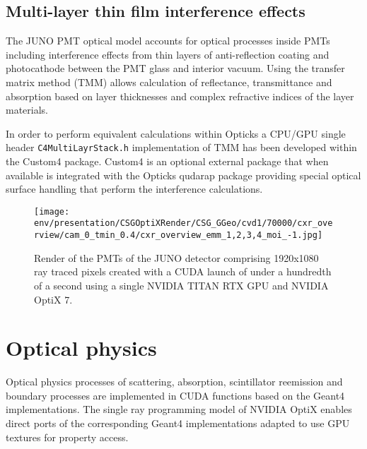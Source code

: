 \documentclass{webofc}
\begin{document}
%
%
\subsection{Multi-layer thin film interference effects} 
%
The JUNO PMT optical model\cite{jpom} accounts for optical processes inside PMTs including 
interference effects from thin layers of anti-reflection coating and photocathode between 
the PMT glass and interior vacuum. Using the transfer matrix method (TMM) allows 
calculation of reflectance, transmittance and absorption based on layer thicknesses 
and complex refractive indices of the layer materials. 

In order to perform equivalent calculations within Opticks a CPU/GPU 
single header {\tt C4MultiLayrStack.h} implementation of TMM 
has been developed within the Custom4 package\cite{custom4}. 
Custom4 is an optional external package that when available 
is integrated with the Opticks qudarap package providing special 
optical surface handling that perform the interference calculations.   
%
%
%
\begin{figure}
\centering
\texttt{[image: env/presentation/CSGOptiXRender/CSG\_GGeo/cvd1/70000/cxr\_overview/cam\_0\_tmin\_0.4/cxr\_overview\_emm\_1,2,3,4\_moi\_-1.jpg]}
\caption{Render of the PMTs of the JUNO detector comprising 1920x1080 ray traced pixels created with a CUDA launch of under a hundredth of a second  
using a single NVIDIA TITAN RTX GPU and NVIDIA OptiX 7.
\label{j1808}}
\end{figure}
%
%
\section{Optical physics}%
%
Optical physics processes of scattering, absorption, scintillator reemission and 
boundary processes are implemented in CUDA functions based on the Geant4
implementations. 
%
The single ray programming model of NVIDIA OptiX enables 
direct ports of the corresponding Geant4 implementations adapted
to use GPU textures for property access. 
\end{document}
